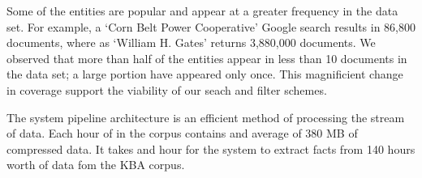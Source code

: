 \documentclass[letterpaper]{article}
\begin{document}

Some of the entities are popular and appear at a greater frequency in the data set.
For example, a `Corn Belt Power Cooperative' Google search results in 86,800 documents, where as `William H. Gates' returns 3,880,000 documents. 
We observed that more than half of the entities appear in less than 10 documents in the data set;
a large portion have appeared only once. This magnificient change in coverage support the viability of our seach and filter schemes.



The system pipeline architecture is an efficient method of processing the stream of data.
Each hour of in the corpus contains and average of 380 MB of compressed data.
It takes and hour for the system to extract facts from 140 hours worth of data fom the KBA corpus.
\end{document}
